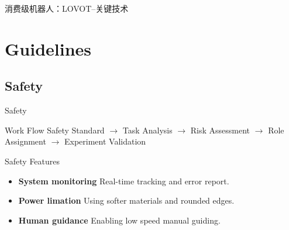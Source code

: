 \documentclass{beamer}
\begin{document}
\begin{frame}{消费级机器人：LOVOT--关键技术}
\end{frame}

\section{Guidelines}

\subsection{Safety}
\begin{frame}{Safety}

\begin{block}{Work Flow}
Safety Standard $\rightarrow$ Task Analysis $\rightarrow$ Risk Assessment $\rightarrow$ Role Assignment $\rightarrow$ Experiment Validation
\end{block}

\vspace{5mm}

\begin{block}{Safety Features}
\begin{itemize}
\item \textbf{System monitoring} Real-time tracking and error report.
\item \textbf{Power limation} Using softer materials and rounded edges.
\item \textbf{Human guidance} Enabling low speed manual guiding.
\end{itemize}
\end{block}

\end{frame}
\end{document}
